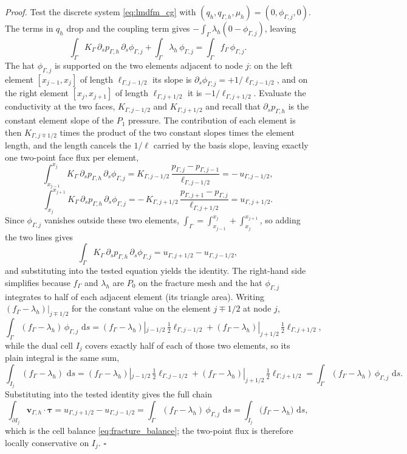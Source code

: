 \documentclass[a4paper,fleqn]{cas-sc}
\newcommand{\dd}{\,\mathrm{d}}
\newcommand{\vflux}{\mathbf{v}}
\begin{document}
\noindent\emph{Proof.}
Test the discrete system \eqref{eq:lmdfm_cg} with
\((q_h,q_{\Gamma,h},\mu_h)=(0,\phi_{\Gamma,j},0)\). The terms in \(q_h\) drop and the
coupling term gives \(-\int_\Gamma\lambda_h(0-\phi_{\Gamma,j})\), leaving
\[
  \int_\Gamma K_\Gamma\,\partial_s p_{\Gamma,h}\,\partial_s\phi_{\Gamma,j}
  +\int_\Gamma\lambda_h\,\phi_{\Gamma,j}
  =\int_\Gamma f_\Gamma\,\phi_{\Gamma,j}.
\]
The hat \(\phi_{\Gamma,j}\) is supported on the two elements adjacent to node \(j\):
on the left element \([x_{j-1},x_j]\) of length \(\ell_{\Gamma,j-1/2}\) its slope is
\(\partial_s\phi_{\Gamma,j}=+1/\ell_{\Gamma,j-1/2}\), and on the right element
\([x_j,x_{j+1}]\) of length \(\ell_{\Gamma,j+1/2}\) it is \(-1/\ell_{\Gamma,j+1/2}\).
Evaluate the conductivity at the two faces, \(K_{\Gamma,j-1/2}\) and
\(K_{\Gamma,j+1/2}\) and
recall that \(\partial_s p_{\Gamma,h}\) is the constant element slope of the
\(P_1\) pressure. The contribution of each element is then
\(K_{\Gamma,j\mp1/2}\) times the product of the two constant slopes times the element
length, and the length cancels the \(1/\ell\) carried by the basis slope, leaving
exactly one two-point face flux per element,
\[
  \int_{x_{j-1}}^{x_j} K_\Gamma\,\partial_s p_{\Gamma,h}\,\partial_s\phi_{\Gamma,j}
  =K_{\Gamma,j-1/2}\,\frac{p_{\Gamma,j}-p_{\Gamma,j-1}}{\ell_{\Gamma,j-1/2}}
  =-\,u_{\Gamma,j-1/2},
\]
\[
  \int_{x_j}^{x_{j+1}} K_\Gamma\,\partial_s p_{\Gamma,h}\,\partial_s\phi_{\Gamma,j}
  =-\,K_{\Gamma,j+1/2}\,\frac{p_{\Gamma,j+1}-p_{\Gamma,j}}{\ell_{\Gamma,j+1/2}}
  =u_{\Gamma,j+1/2}.
\]
Since \(\phi_{\Gamma,j}\) vanishes outside these two elements,
\(\int_\Gamma=\int_{x_{j-1}}^{x_j}+\int_{x_j}^{x_{j+1}}\), so adding the two lines
gives
\[
  \int_\Gamma K_\Gamma\,\partial_s p_{\Gamma,h}\,\partial_s\phi_{\Gamma,j}
  =u_{\Gamma,j+1/2}-u_{\Gamma,j-1/2},
\]
and substituting into the tested equation yields the identity. The right-hand
side simplifies because \(f_\Gamma\) and \(\lambda_h\) are \(P_0\) on
the fracture mesh and the hat \(\phi_{\Gamma,j}\) integrates to half of each
adjacent element (its triangle area). Writing
\((f_\Gamma-\lambda_h)|_{j\mp1/2}\) for the constant value on the element
\(j\mp1/2\) at node \(j\),
\[
  \int_\Gamma(f_\Gamma-\lambda_h)\,\phi_{\Gamma,j}\,\dd s
  =
  (f_\Gamma-\lambda_h)|_{j-1/2}\,\tfrac12\ell_{\Gamma,j-1/2}
  +(f_\Gamma-\lambda_h)|_{j+1/2}\,\tfrac12\ell_{\Gamma,j+1/2},
\]
while the dual cell \(I_j\) covers exactly half of each of those two elements,
so its plain integral is the same sum,
\[
  \int_{I_j}(f_\Gamma-\lambda_h)\,\dd s
  =
  (f_\Gamma-\lambda_h)|_{j-1/2}\,\tfrac12\ell_{\Gamma,j-1/2}
  +(f_\Gamma-\lambda_h)|_{j+1/2}\,\tfrac12\ell_{\Gamma,j+1/2}
  =\int_\Gamma(f_\Gamma-\lambda_h)\,\phi_{\Gamma,j}\,\dd s .
\]
Substituting into the tested identity gives the full chain
\[
  \int_{\partial I_j}\vflux_{\Gamma,h}\cdot\bm\tau
  =u_{\Gamma,j+1/2}-u_{\Gamma,j-1/2}
  =\int_\Gamma(f_\Gamma-\lambda_h)\,\phi_{\Gamma,j}\,\dd s
  =\int_{I_j}\bigl(f_\Gamma-\lambda_h\bigr)\,\dd s ,
\]
which is the cell balance \eqref{eq:fracture_balance}; the two-point flux is
therefore locally conservative on \(I_j\). \(\square\)
\end{document}
